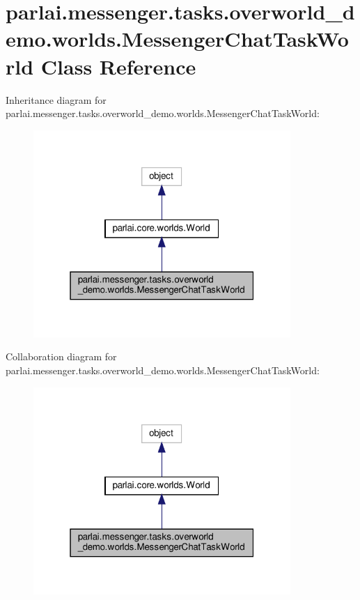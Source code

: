 \hypertarget{classparlai_1_1messenger_1_1tasks_1_1overworld__demo_1_1worlds_1_1MessengerChatTaskWorld}{}\section{parlai.\+messenger.\+tasks.\+overworld\+\_\+demo.\+worlds.\+Messenger\+Chat\+Task\+World Class Reference}
\label{classparlai_1_1messenger_1_1tasks_1_1overworld__demo_1_1worlds_1_1MessengerChatTaskWorld}


Inheritance diagram for parlai.\+messenger.\+tasks.\+overworld\+\_\+demo.\+worlds.\+Messenger\+Chat\+Task\+World\+:
\nopagebreak
\begin{figure}[H]
\begin{center}
\leavevmode
\includegraphics[width=277pt]{classparlai_1_1messenger_1_1tasks_1_1overworld__demo_1_1worlds_1_1MessengerChatTaskWorld__inherit__graph}
\end{center}
\end{figure}


Collaboration diagram for parlai.\+messenger.\+tasks.\+overworld\+\_\+demo.\+worlds.\+Messenger\+Chat\+Task\+World\+:
\nopagebreak
\begin{figure}[H]
\begin{center}
\leavevmode
\includegraphics[width=277pt]{classparlai_1_1messenger_1_1tasks_1_1overworld__demo_1_1worlds_1_1MessengerChatTaskWorld__coll__graph}
\end{center}
\end{figure}
